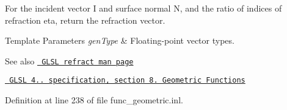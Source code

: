 For the incident vector I and surface normal N, and the ratio of indices of refraction eta, return the refraction vector.


\begin{DoxyTemplParams}{Template Parameters}
{\em gen\+Type} & Floating-\/point vector types.\\
\hline
\end{DoxyTemplParams}
\begin{DoxySeeAlso}{See also}
\href{http://www.opengl.org/sdk/docs/manglsl/xhtml/refract.xml}{\texttt{ G\+L\+SL refract man page}} 

\href{http://www.opengl.org/registry/doc/GLSLangSpec.4.20.8.pdf}{\texttt{ G\+L\+SL 4.. specification, section 8. Geometric Functions}} 
\end{DoxySeeAlso}


Definition at line 238 of file func\+\_\+geometric.\+inl.

